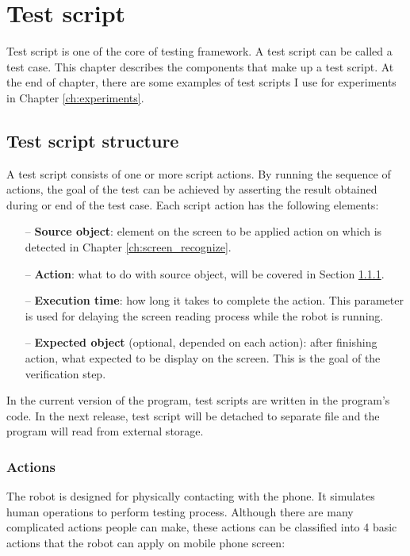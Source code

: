 \chapter{Test script}
\label{ch:test_script}
Test script is one of the core of testing framework.
A test script can be called a test case.
This chapter describes the components that make up a test script. At the end of chapter, there are some examples of test scripts I use for experiments in Chapter \ref{ch:experiments}.

\section{Test script structure}
\label{sec:script_comp}
A test script consists of one or more script actions. By running the sequence of actions, the goal of the test can be achieved by asserting the result obtained during or end of the test case. Each script action has the following elements:
    \begin{itemize}
		\item[--] \textbf{Source object}: element on the screen to be applied action on which is detected in Chapter \ref{ch:screen_recognize}.
		\item[--] \textbf{Action}: what to do with source object, will be covered in Section \ref{sec:actions}.
		\item[--] \textbf{Execution time}: how long it takes to complete the action. This parameter is used for delaying the screen reading process while the robot is running.
		\item[--] \textbf{Expected object} (optional, depended on each action): after finishing action, what expected to be display on the screen. This is the goal of the verification step.
	\end{itemize}

In the current version of the program, test scripts are written in the program's code. In the next release, test script will be detached to separate file and the program will read from external storage.

\subsection{Actions}
\label{sec:actions}
The robot is designed for physically contacting with the phone. It simulates human operations to perform testing process.
Although there are many complicated actions people can make, these actions can be classified into 4 basic actions that the robot can apply on mobile phone screen:

